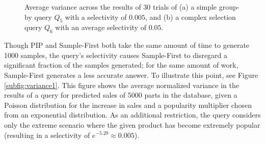 \begin{figure}
\begin{center}
\caption{Average variance across the results of 30 trials of (a) a simple group-by query $Q_5$ with a selectivity of $0.005$, and (b) a complex selection query $Q_6$ with an average selectivity of $0.05$.}
\label{fig:variance}
\end{center}
\end{figure}

Though PIP and Sample-First both take the same amount of time to generate 1000 samples, the query's selectivity causes Sample-First to disregard a significant fraction of the samples generated; for the same amount of work, Sample-First generates a less accurate answer.  To illustrate this point, see Figure \ref{subfig:variance1}.  This figure shows the average normalized variance in the results of a query for predicted sales of 5000 parts in the database, given a Poisson distribution for the increase in sales and a popularity multiplier chosen from an exponential distribution.  As an additional restriction, the query considers only the extreme scenario where the given product has become extremely popular (resulting in a selectivity of $e^{-5.29} \approx 0.005$).  

